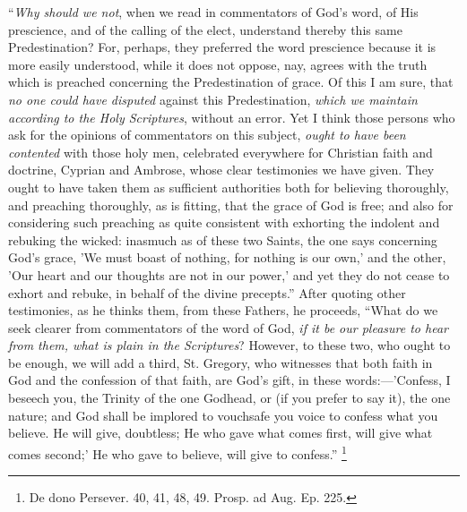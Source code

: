 ``\emph{Why should we not}, when we read in commentators of God's
word, of His prescience, and of the calling of the elect, understand
thereby this same Predestination? For, perhaps, they preferred the
word prescience because it is more easily understood, while it does
not oppose, nay, agrees with the truth which is preached concerning
the Predestination of grace. Of this I am sure, that \emph{no one could
have disputed} against this Predestination, \emph{which we maintain
according to the Holy Scriptures}, without an error. Yet I think
those persons who ask for the opinions of commentators on this
subject, \emph{ought to have been contented} with those holy men,
celebrated everywhere for Christian faith and doctrine, Cyprian and
Ambrose, whose clear testimonies we have given. They ought to have
taken them as sufficient authorities both for believing thoroughly,
and preaching thoroughly, as is fitting, that the grace of God is
free; and also for considering such preaching as quite consistent with
exhorting the indolent and rebuking the wicked: inasmuch as of these
two Saints, the one says concerning God's grace, 'We must boast
of nothing, for nothing is our own,' and the other, 'Our heart and our
thoughts are not in our power,' and yet they do not cease to exhort
and rebuke, in behalf of the divine precepts.'' After quoting
other testimonies, as he thinks them, from these Fathers, he proceeds,
``What do we seek clearer from commentators of the word of God, \emph{if
it be our pleasure to hear from them, what is plain in the Scriptures}?
However, to these two, who ought to be enough, we will add a third,
St. Gregory, who witnesses that both faith in God and the confession
of that faith, are God's gift, in these words:—'Confess, I beseech
you, the Trinity of the one Godhead, or (if you prefer to say it), the
one nature; and God shall be implored to vouchsafe you voice to
confess what you believe. He will give, doubtless; He who gave what
comes first, will give what comes second;' He who gave to believe,
will give to confess.'' \footnote{De dono Persever. 40, 41, 48, 49. Prosp. ad
Aug. Ep. 225.}

